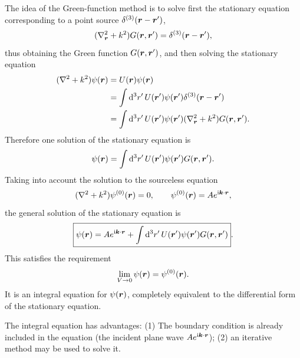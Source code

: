 The idea of the Green-function method is to solve first the stationary equation corresponding to a point source $\delta^{(3)}(\bm{r}-\bm{r}')$,
\begin{equation}
(\nabla_{\bm{r}}^2+k^2)G(\bm{r},\bm{r}')=\delta^{(3)}(\bm{r}-\bm{r}'),
\end{equation}
thus obtaining the Green function $G(\bm{r},\bm{r}')$, and then solving the stationary equation
\begin{equation}\begin{aligned}
(\nabla^2+k^2)\psi(\bm{r})
&=U(\bm{r})\psi(\bm{r})\\
&=\int\mathrm{d}^3r'\,U(\bm{r}')\psi(\bm{r}')\delta^{(3)}(\bm{r}-\bm{r}')\\
&=\int\mathrm{d}^3r'\,U(\bm{r}')\psi(\bm{r}')
   (\nabla_{\bm{r}}^2+k^2)G(\bm{r},\bm{r}').
\end{aligned}\end{equation}
Therefore one solution of the stationary equation is
\begin{equation}
\psi(\bm{r})=\int\mathrm{d}^3r'\,U(\bm{r}')\psi(\bm{r}')G(\bm{r},\bm{r}').
\end{equation}
Taking into account the solution to the sourceless equation
\begin{equation}
(\nabla^2+k^2)\psi^{(0)}(\bm{r})=0,\qquad
\psi^{(0)}(\bm{r})=A e^{\mathrm{i}\bm{k}\cdot\bm{r}},
\end{equation}
the general solution of the stationary equation is
\begin{equation}
\boxed{\psi(\bm{r})=A e^{\mathrm{i}\bm{k}\cdot\bm{r}}+
\int\mathrm{d}^3r'\,U(\bm{r}')\psi(\bm{r}')G(\bm{r},\bm{r}')}.
\end{equation}
This satisfies the requirement
\begin{equation}
\lim_{V\to0}\psi(\bm{r})=\psi^{(0)}(\bm{r}).
\end{equation}
It is an integral equation for $\psi(\bm{r})$, completely equivalent to the differential form of the stationary equation.

The integral equation has advantages: (1) The boundary condition is already included in the equation (the incident plane wave $Ae^{\mathrm{i}\bm{k}\cdot\bm{r}}$); (2) an iterative method may be used to solve it.

